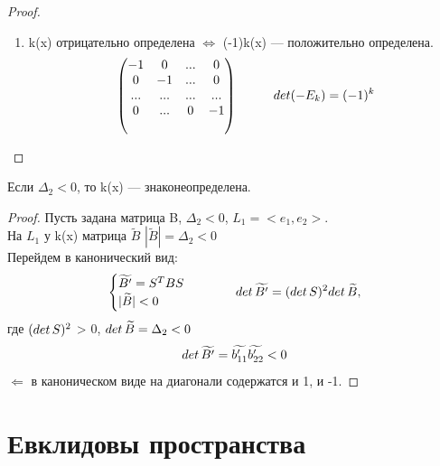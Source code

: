 \begin{proof}
\begin{enumerate}
        ...\\
        Аналогично остальные $b_{ii}' > 0$.
        \item k(x) отрицательно определена $\Longleftrightarrow$ (-1)k(x) --- положительно определена.
        \[
        \begin{pmatrix}
            -1 & 0 & ... & 0\\
            0 & -1 & ... & 0\\
            ... & ... & ... & ...\\
            0 & ... & 0 & -1\\\
        \end{pmatrix}\hspace*{1cm} det(-E_k) = (-1)^k
        \]
    \end{enumerate}
\end{proof}

\begin{proposition}
    Если $\Delta_2 < 0$, то k(x) --- знаконеопределена.
\end{proposition}
\begin{proof}
    Пусть задана матрица B, $\Delta_2 < 0$, $L_1 = <e_1, e_2>$.\\
    На $L_1$ у k(x) матрица $\widetilde{B}$ \tab $|\widetilde{B}| = \Delta_2 < 0$\\
    Перейдем в канонический вид:
    \[
    \begin{cases}
        \widetilde{B'} = S^TBS\\
        |\widetilde{B}| < 0\\
    \end{cases} \hspace*{1cm} det\thinspace\widetilde{B'} = (det\thinspace S)^2 det\thinspace\widetilde{B},
    \]
    где $(det\thinspace S)^2$ > 0, $det\thinspace\widetilde{B} = \Delta_2 < 0$
    \[
    det\thinspace\widetilde{B'} = \widetilde{b_{11}'}\widetilde{b_{22}'} < 0
    \]
    $\Longleftarrow$ в каноническом виде на диагонали содержатся и 1, и -1.
\end{proof}

\section{Евклидовы пространства}

